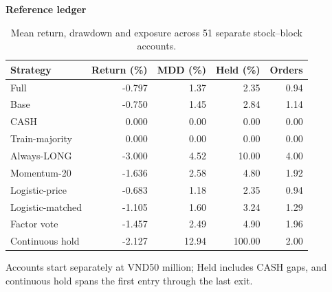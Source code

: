 \begin{table}[htb]
\centering\small
\setlength{\tabcolsep}{3pt}
\renewcommand{\arraystretch}{1.15}
\caption{Mean return, drawdown and exposure across 51 separate stock--block accounts.}
\label{tab:accounts}
\textbf{Reference ledger}\par\smallskip
\begin{tabular}{lrrrr}
\hline
Strategy & Return (\%) & MDD (\%) & Held (\%) & Orders \\
\hline
Full & -0.797 & 1.37 & 2.35 & 0.94 \\
Base & -0.750 & 1.45 & 2.84 & 1.14 \\
CASH & 0.000 & 0.00 & 0.00 & 0.00 \\
Train-majority & 0.000 & 0.00 & 0.00 & 0.00 \\
Always-LONG & -3.000 & 4.52 & 10.00 & 4.00 \\
Momentum-20 & -1.636 & 2.58 & 4.80 & 1.92 \\
Logistic-price & -0.683 & 1.18 & 2.35 & 0.94 \\
Logistic-matched & -1.105 & 1.60 & 3.24 & 1.29 \\
Factor vote & -1.457 & 2.49 & 4.90 & 1.96 \\
Continuous hold & -2.127 & 12.94 & 100.00 & 2.00 \\
\hline
\end{tabular}\par\medskip
\begin{minipage}{\textwidth}\footnotesize Accounts start separately at VND50 million; Held includes CASH gaps, and continuous hold spans the first entry through the last exit.\end{minipage}
\end{table}
